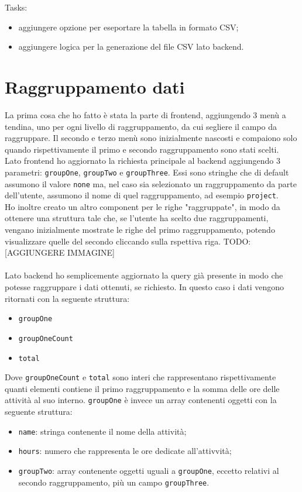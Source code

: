 \noindent Tasks:
\begin{itemize}
  \item aggiungere opzione per eseportare la tabella in formato CSV;
  \item aggiungere logica per la generazione del file CSV lato backend.
\end{itemize}


\section{Raggruppamento dati}
La prima cosa che ho fatto è stata la parte di frontend, aggiungendo 3 menù a tendina, uno per ogni livello di raggruppamento, da cui segliere il campo da raggruppare. Il secondo e terzo menù sono inizialmente nascosti e compaiono solo quando rispettivamente il primo e secondo raggruppamento sono stati scelti.\\
Lato frontend ho aggiornato la richiesta principale al backend aggiungendo 3 parametri: \texttt{groupOne}, \texttt{groupTwo} e \texttt{groupThree}. Essi sono stringhe che di default assumono il valore \texttt{none} ma, nel caso sia selezionato un raggruppamento da parte dell'utente, assumono il nome di quel raggruppamento, ad esempio \texttt{project}.\\
Ho inoltre creato un altro component per le righe "raggruppate", in modo da ottenere una struttura tale che, se l'utente ha scelto due raggruppamenti, vengano inizialmente mostrate le righe del primo raggruppamento, potendo visualizzare quelle del secondo cliccando sulla rspettiva riga. TODO: [AGGIUNGERE IMMAGINE]\\\\
Lato backend ho semplicemente aggiornato la query già presente in modo che potesse raggruppare i dati ottenuti, se richiesto. In questo caso i dati vengono ritornati con la seguente struttura:
\begin{itemize}
  \item \texttt{groupOne}
  \item \texttt{groupOneCount}
  \item \texttt{total}
\end{itemize}
Dove \texttt{groupOneCount} e \texttt{total} sono interi che rappresentano rispettivamente quanti elementi contiene il primo raggruppamento e la somma delle ore delle attività al suo interno.
\texttt{groupOne} è invece un array contenenti oggetti con la seguente struttura:
\begin{itemize}
  \item \texttt{name}: stringa contenente il nome della attività;
  \item \texttt{hours}: numero che rappresenta le ore dedicate all'attivvità;
  \item \texttt{groupTwo}: array contenente oggetti uguali a \texttt{groupOne}, eccetto relativi al secondo raggruppamento, più un campo \texttt{groupThree}.
\end{itemize}

